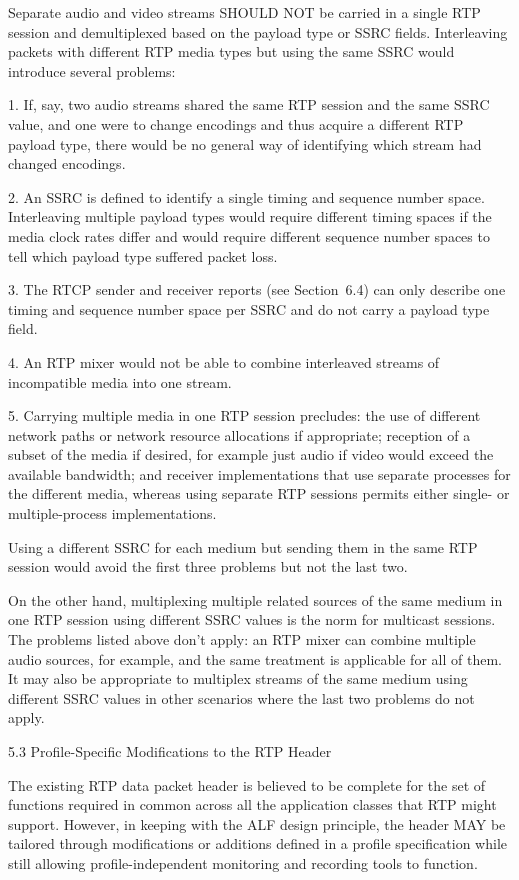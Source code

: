 \documentclass{article}
\begin{document}
Separate audio and video streams SHOULD NOT be carried in a single RTP session and demultiplexed based on the payload type or SSRC fields.  Interleaving packets with different RTP media types but using the same SSRC would introduce several problems:

1. If, say, two audio streams shared the same RTP session and the same SSRC value, and one were to change encodings and thus acquire a different RTP payload type, there would be no general way of identifying which stream had changed encodings.

2. An SSRC is defined to identify a single timing and sequence number space.  Interleaving multiple payload types would require different timing spaces if the media clock rates differ and would require different sequence number spaces to tell which payload type suffered packet loss.

3. The RTCP sender and receiver reports (see Section~6.4) can only describe one timing and sequence number space per SSRC and do not carry a payload type field.

4. An RTP mixer would not be able to combine interleaved streams of incompatible media into one stream.

5. Carrying multiple media in one RTP session precludes: the use of different network paths or network resource allocations if appropriate; reception of a subset of the media if desired, for example just audio if video would exceed the available bandwidth; and receiver implementations that use separate processes for the different media, whereas using separate RTP sessions permits either single- or multiple-process implementations.

Using a different SSRC for each medium but sending them in the same RTP session would avoid the first three problems but not the last two.

On the other hand, multiplexing multiple related sources of the same medium in one RTP session using different SSRC values is the norm for multicast sessions.  The problems listed above don't apply: an RTP mixer can combine multiple audio sources, for example, and the same treatment is applicable for all of them.  It may also be appropriate to multiplex streams of the same medium using different SSRC values in other scenarios where the last two problems do not apply.

5.3 Profile-Specific Modifications to the RTP Header

The existing RTP data packet header is believed to be complete for the set of functions required in common across all the application classes that RTP might support.  However, in keeping with the ALF design principle, the header MAY be tailored through modifications or additions defined in a profile specification while still allowing profile-independent monitoring and recording tools to function.
\end{document}
